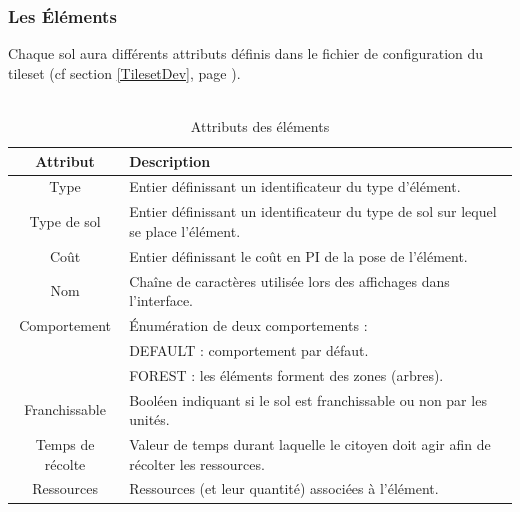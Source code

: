 \documentclass[a4paper]{memoir}
\begin{document}
				\subsubsection{Les \'Eléments}
					Chaque sol aura différents attributs définis dans le fichier de configuration du tileset (cf section \ref{TilesetDev}, page \pageref{TilesetDev}).\\
					\\
					\begin{table}[H]
						\begin{small}
							\begin{tabular}{| c | l |}
								\hline
								\textbf{Attribut} & \textbf{Description}\\
								\hline
								Type & Entier définissant un identificateur du type d'élément.\\
								\hline
								Type de sol & Entier définissant un identificateur du type de sol sur lequel se place l'élément.\\
								\hline
								Coût & Entier définissant le coût en PI de la pose de l'élément.\\
								\hline
								Nom & Chaîne de caractères utilisée lors des affichages dans l'interface.\\
								\hline
								Comportement & \'Enumération de deux comportements :\\
								& DEFAULT : comportement par défaut.\\
								& FOREST : les éléments forment des zones (arbres).\\
								\hline
								Franchissable & Booléen indiquant si le sol est franchissable ou non par les unités.\\
								\hline
								Temps de récolte & Valeur de temps durant laquelle le citoyen doit agir afin de récolter les ressources.\\
								\hline
								Ressources & Ressources (et leur quantité) associées à l'élément.\\
								\hline
							\end{tabular}
						\end{small}
						\label{tab:element}
						\caption{Attributs des éléments}
					\end{table}
					
					
\end{document}
